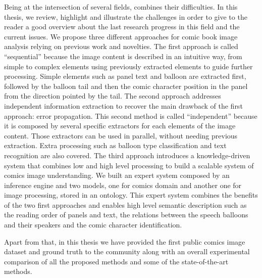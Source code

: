 Being at the intersection of several fields, combines their difficulties.
In this thesis, we review, highlight and illustrate the challenges in order to give to the reader a good overview about the last research progress in this field and the current issues.
We propose three different approaches for comic book image analysis relying on previous work and novelties.
The first approach is called ``sequential'' because the image content is described in an intuitive way, from simple to complex elements using previously extracted elements to guide further processing.
Simple elements such as panel text and balloon are extracted first, followed by the balloon tail and then the comic character position in the panel from the direction pointed by the tail.
The second approach addresses independent information extraction to recover the main drawback of the first approach: error propagation.
This second method is called ``independent'' because it is composed by several specific extractors for each elements of the image content.
Those extractors can be used in parallel, without needing previous extraction.
Extra processing such as balloon type classification and text recognition are also covered.
The third approach introduces a knowledge-driven system that combines low and high level processing to build a scalable system of comics image understanding.
We built an expert system composed by an inference engine and two models, one for comics domain and another one for image processing, stored in an ontology.
This expert system combines the benefits of the two first approaches and enables high level semantic description such as the reading order of panels and text, the relations between the speech balloons and their speakers and the comic character identification.

Apart from that, in this thesis we have provided the first public comics image dataset and ground truth to the community along with an overall experimental comparison of all the proposed methods and some of the state-of-the-art methods.



